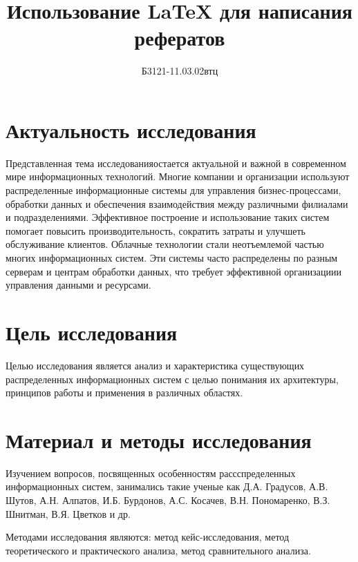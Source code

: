 \documentclass[report, draught]{fefudoc}
\author{Б3121-11.03.02втц}{Созонтов А. В.}
\title{Использование \LaTeX{} для написания рефератов} %
\begin{document}
\frontpage
\tableofcontents

\section{Актуальность исследования}

Представленная тема исследованияостается актуальной и важной в современном мире информационных технологий. Многие компании и организации используют распределенные информационные системы для управления бизнес-процессами, обработки данных и обеспечения взаимодействия между различными филиалами и подразделениями. Эффективное построение и использование таких систем помогает повысить производительность, сократить затраты и улучшеть обслуживание клиентов. Облачные технологии стали неотъемлемой частью многих информационных систем. Эти системы часто распределены по разным серверам и центрам обработки данных, что требует эффективной организациии управления данными и ресурсами.

\section{Цель исследования}
Целью исследования является анализ и характеристика существующих распределенных информационных систем с целью понимания их архитектуры, принципов работы и применения в различных областях.

\section{Материал и методы исследования}
Изучением вопросов, посвященных особенностям рассспределенных информационных систем, занимались такие ученые как Д.А. Градусов, А.В. Шутов, А.Н. Алпатов, И.Б. Бурдонов, А.С. Косачев, В.Н. Пономаренко, В.З. Шнитман, В.Я. Цветков и др.

Методами исследования являются: метод кейс-исследования, метод теоретического и практического анализа, метод сравнительного анализа.
\end{document}
